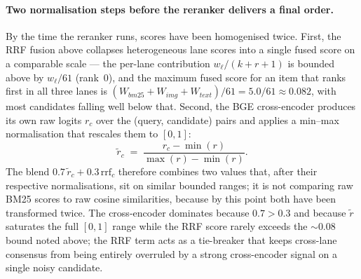 \paragraph{Two normalisation steps before the reranker delivers a final order.}
By the time the reranker runs, scores have been homogenised twice. First, the RRF fusion above collapses heterogeneous lane scores into a single fused score on a comparable scale --- the per-lane contribution $w_\ell / (k + r + 1)$ is bounded above by $w_\ell / 61$ (rank~0), and the maximum fused score for an item that ranks first in all three lanes is $(W_{bm25} + W_{img} + W_{text}) / 61 = 5.0 / 61 \approx 0.082$, with most candidates falling well below that. Second, the BGE cross-encoder produces its own raw logits $r_c$ over the (query, candidate) pairs and applies a min--max normalisation that rescales them to $[0,1]$:
\begin{equation*}
\tilde r_c \;=\; \frac{r_c - \min(r)}{\max(r) - \min(r)}.
\end{equation*}
The blend $0.7\,\tilde r_c + 0.3\,\text{rrf}_c$ therefore combines two values that, after their respective normalisations, sit on similar bounded ranges; it is not comparing raw BM25 scores to raw cosine similarities, because by this point both have been transformed twice. The cross-encoder dominates because $0.7 > 0.3$ and because $\tilde r$ saturates the full $[0,1]$ range while the RRF score rarely exceeds the $\sim 0.08$ bound noted above; the RRF term acts as a tie-breaker that keeps cross-lane consensus from being entirely overruled by a strong cross-encoder signal on a single noisy candidate.

